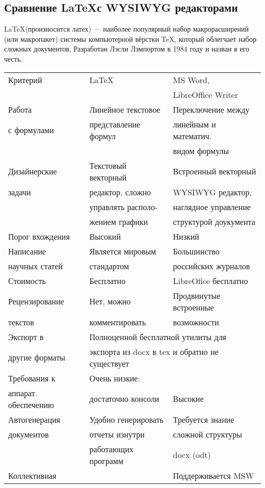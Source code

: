 \subsection{Сравнение \LaTeX с WYSIWYG редакторами}
\LaTeX (произносится латех) — наиболее популярный набор макрорасширений (или макропакет) системы компьютерной вёрстки \TeX, который облегчает набор сложных документов. Разработан Лэсли Лэмпортом в 1984 году и назван в его честь.
\begin{table}
\begin{tabular}{|l|l|l|}
\hline
Критерий & \LaTeX & MS Word, \\
 & & LibreOffice Writer \\
\hline
 Работа& Линейное текстовое & Переключение между \\
с формулами &  представление формул & линейным и математич.  \\
 &  &  видом формулы \\
\hline
 Дизайнерские& Текстовый векторный & Встроенный векторный \\
 задачи& редактор, сложно&  WYSIWYG редактор, \\
&  управлять располо-& наглядное управление \\
&жением графики & структурой доукумента \\
\hline
Порог вхождения& Высокий& Низкий \\
\hline
Написание& Является мировым& Большинство  \\
научных статей& стандартом& российских журналов \\
\hline
Стоимость&Бесплатно&LibreOfice бесплатно \\
\hline
Рецензирование&Нет, можно&Продвинутые встроенные \\
текстов& комментировать &возможности \\
\hline
Экспорт в &\multicolumn{2}{l|}{Полноценной бесплатной утилиты для } \\
 другие форматы& \multicolumn{2}{l|}{экспорта из docx в tex и обратно не существует} \\
\hline
Требования к& Очень низкие:& \\
аппарат. обеспечению& достаточно консоли & Высокие\\
\hline
Автогенерация&Удобно генерировать& Требуется знание\\
документов&отчеты изнутри&  сложной структуры \\
 &работающих программ&  docx (odt) \\
\hline
Коллективная& &Поддерживается MSW\\

\end{tabular}
\end{table}
